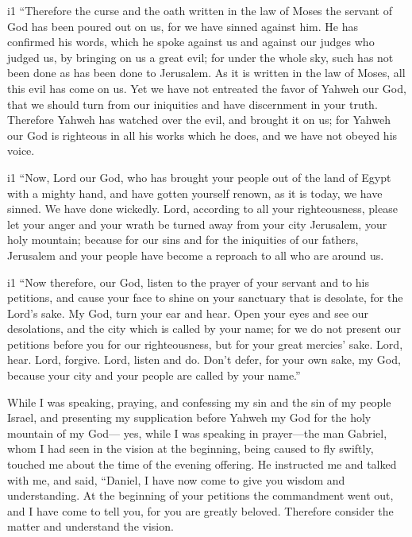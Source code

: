 i1 ``Therefore the curse and the oath written in the law of Moses the
servant of God has been poured out on us, for we have sinned against
him.  He has confirmed his words, which he spoke against
us and against our judges who judged us, by bringing on us a great evil;
for under the whole sky, such has not been done as has been done to
Jerusalem.  As it is written in the law of Moses, all
this evil has come on us. Yet we have not entreated the favor of Yahweh
our God, that we should turn from our iniquities and have discernment in
your truth.  Therefore Yahweh has watched over the evil,
and brought it on us; for Yahweh our God is righteous in all his works
which he does, and we have not obeyed his voice.

i1  ``Now, Lord our God, who has brought your people out
of the land of Egypt with a mighty hand, and have gotten yourself
renown, as it is today, we have sinned. We have done wickedly.
 Lord, according to all your righteousness, please let
your anger and your wrath be turned away from your city Jerusalem, your
holy mountain; because for our sins and for the iniquities of our
fathers, Jerusalem and your people have become a reproach to all who are
around us.

i1  ``Now therefore, our God, listen to the prayer of
your servant and to his petitions, and cause your face to shine on your
sanctuary that is desolate, for the Lord's sake.  My God,
turn your ear and hear. Open your eyes and see our desolations, and the
city which is called by your name; for we do not present our petitions
before you for our righteousness, but for your great mercies' sake.
 Lord, hear. Lord, forgive. Lord, listen and do. Don't
defer, for your own sake, my God, because your city and your people are
called by your name.''

 While I was speaking, praying, and confessing my sin and
the sin of my people Israel, and presenting my supplication before
Yahweh my God for the holy mountain of my God---  yes,
while I was speaking in prayer---the man Gabriel, whom I had seen in the
vision at the beginning, being caused to fly swiftly, touched me about
the time of the evening offering.  He instructed me and
talked with me, and said, ``Daniel, I have now come to give you wisdom
and understanding.  At the beginning of your petitions
the commandment went out, and I have come to tell you, for you are
greatly beloved. Therefore consider the matter and understand the
vision.

